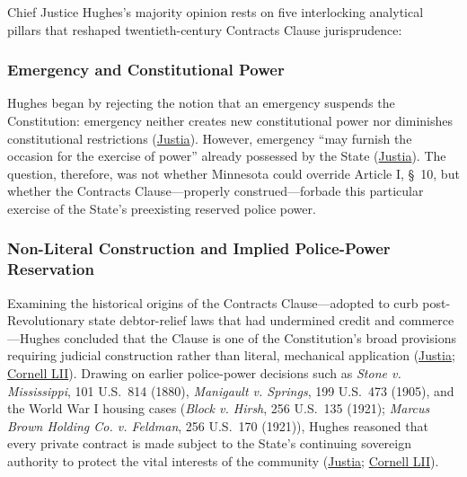 \documentclass[12pt]{article}
\begin{document}
Chief Justice Hughes's majority opinion rests on five interlocking analytical pillars that reshaped twentieth-century Contracts Clause jurisprudence:

\subsubsection{Emergency and Constitutional Power}

Hughes began by rejecting the notion that an emergency suspends the Constitution: emergency neither creates new constitutional power nor diminishes constitutional restrictions (\href{https://supreme.justia.com/cases/federal/us/290/398/}{Justia}). However, emergency ``may furnish the occasion for the exercise of power'' already possessed by the State (\href{https://supreme.justia.com/cases/federal/us/290/398/}{Justia}). The question, therefore, was not whether Minnesota could override Article I, \S\ 10, but whether the Contracts Clause---properly construed---forbade this particular exercise of the State's preexisting reserved police power.

\subsubsection{Non-Literal Construction and Implied Police-Power Reservation}

Examining the historical origins of the Contracts Clause---adopted to curb post-Revolutionary state debtor-relief laws that had undermined credit and commerce---Hughes concluded that the Clause is one of the Constitution's broad provisions requiring judicial construction rather than literal, mechanical application (\href{https://supreme.justia.com/cases/federal/us/290/398/}{Justia}; \href{https://www.law.cornell.edu/constitution-conan/article-1/section-10/clause-1/historical-background-on-the-contract-clause}{Cornell LII}). Drawing on earlier police-power decisions such as \emph{Stone v. Mississippi}, 101 U.S.\ 814 (1880), \emph{Manigault v. Springs}, 199 U.S.\ 473 (1905), and the World War I housing cases (\emph{Block v. Hirsh}, 256 U.S.\ 135 (1921); \emph{Marcus Brown Holding Co. v. Feldman}, 256 U.S.\ 170 (1921)), Hughes reasoned that every private contract is made subject to the State's continuing sovereign authority to protect the vital interests of the community (\href{https://supreme.justia.com/cases/federal/us/290/398/}{Justia}; \href{https://www.law.cornell.edu/constitution-conan/article-1/section-10/clause-1/blaisdell-case-and-state-modifications-to-private-contracts}{Cornell LII}).
\end{document}
